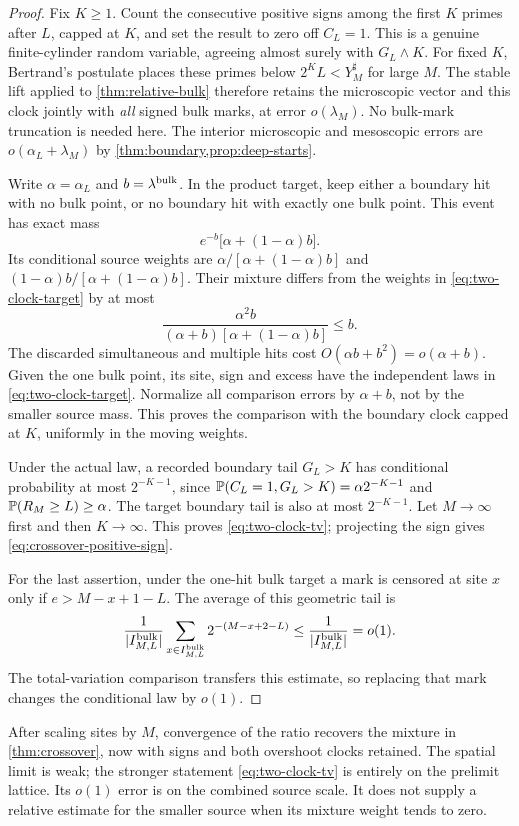 \begin{proof}
Fix $K\ge1$. Count the consecutive positive signs among the first $K$
primes after $L$, capped at $K$, and set the result to zero off $C_L=1$.
This is a genuine finite-cylinder random variable, agreeing almost surely
with $G_L\wedge K$. For fixed $K$, Bertrand's postulate places these
primes below $2^K L<Y_M^\sharp$ for large $M$. The stable lift applied to
\cref{thm:relative-bulk} therefore retains the microscopic vector and
this clock jointly with \emph{all} signed bulk marks, at error
$o(\lambda_M)$. No bulk-mark truncation is needed here.
The interior microscopic and mesoscopic errors are
$o(\alpha_L+\lambda_M)$ by \cref{thm:boundary,prop:deep-starts}.

Write $\alpha=\alpha_L$ and $b=\lambda^{\rm bulk}$.
In the product target, keep either a boundary hit with no bulk point,
or no boundary hit with exactly one bulk point. This event has exact mass
\[
 e^{-b}\bigl[\alpha+(1-\alpha)b\bigr].
\]
Its conditional source weights are
$\alpha/[\alpha+(1-\alpha)b]$ and
$(1-\alpha)b/[\alpha+(1-\alpha)b]$.
Their mixture differs from the weights in \eqref{eq:two-clock-target}
by at most
\[
 \frac{\alpha^2b}{(\alpha+b)[\alpha+(1-\alpha)b]}\le b.
\]
The discarded simultaneous and multiple hits cost
$O(\alpha b+b^2)=o(\alpha+b)$.
Given the one bulk point, its site, sign and excess have the independent
laws in \eqref{eq:two-clock-target}. Normalize all comparison errors by
$\alpha+b$, not by the smaller source mass. This proves the comparison
with the boundary clock capped at $K$, uniformly in the moving weights.

Under the actual law, a recorded boundary tail $G_L>K$ has conditional
probability at most $2^{-K-1}$, since
$\mathbb P(C_L=1,G_L>K)=\alpha2^{-K-1}$ and
$\mathbb P(R_M\ge L)\ge\alpha$. The target boundary tail is also at most
$2^{-K-1}$. Let $M\to\infty$ first and then $K\to\infty$.
This proves \eqref{eq:two-clock-tv}; projecting the sign gives
\eqref{eq:crossover-positive-sign}.

For the last assertion, under the one-hit bulk target a mark is censored
at site $x$ only if $e>M-x+1-L$. The average of this geometric tail is
\[
 \frac1{|I^{\rm bulk}_{M,L}|}
 \sum_{x\in I^{\rm bulk}_{M,L}}2^{-(M-x+2-L)}
       \le\frac1{|I^{\rm bulk}_{M,L}|}=o(1).
\]
The total-variation comparison transfers this estimate, so replacing that
mark changes the conditional law by $o(1)$.
\end{proof}
After scaling sites by $M$, convergence of the ratio recovers the mixture
in \cref{thm:crossover}, now with signs and both overshoot clocks retained.
The spatial limit is weak; the stronger statement
\eqref{eq:two-clock-tv} is entirely on the prelimit lattice. Its $o(1)$
error is on the combined source scale. It does not supply a relative
estimate for the smaller source when its mixture weight tends to zero.


